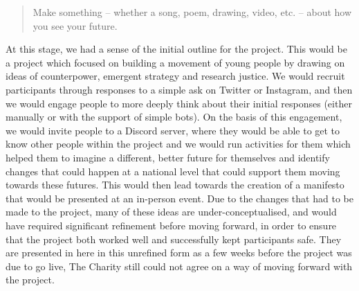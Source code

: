 \blockquote{Make something – whether a song, poem, drawing, video, etc. – about how you see your future.}

At this stage, we had a sense of the initial outline for the project. This would be a project which focused on building a movement of young people by drawing on ideas of counterpower, emergent strategy and research justice. We would recruit participants through responses to a simple ask on Twitter or Instagram, and then we would engage people to more deeply think about their initial responses (either manually or with the support of simple bots). On the basis of this engagement, we would invite people to a Discord server, where they would be able to get to know other people within the project and we would run activities for them which helped them to imagine a different, better future for themselves and identify changes that could happen at a national level that could support them moving towards these futures. This would then lead towards the creation of a manifesto that would be presented at an in-person event. Due to the changes that had to be made to the project, many of these ideas are under-conceptualised, and would have required significant refinement before moving forward, in order to ensure that the project both worked well and successfully kept participants safe. They are presented in here in this unrefined form as a few weeks before the project was due to go live, The Charity still could not agree on a way of moving forward with the project. 

